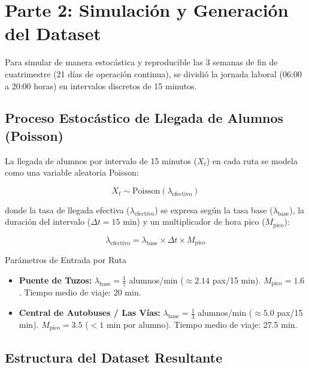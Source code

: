 \section{Parte 2: Simulación y Generación del Dataset}

Para simular de manera estocástica y reproducible las 3 semanas de fin de cuatrimestre (21 días de operación continua), se dividió la jornada laboral (06:00 a 20:00 horas) en intervalos discretos de 15 minutos.

\subsection{Proceso Estocástico de Llegada de Alumnos (Poisson)}

La llegada de alumnos por intervalo de 15 minutos ($X_t$) en cada ruta se modela como una variable aleatoria Poisson:

\begin{equation}
	X_t \sim \text{Poisson}(\lambda_{\text{efectivo}})
\end{equation}

donde la tasa de llegada efectiva ($\lambda_{\text{efectivo}}$) se expresa según la tasa base ($\lambda_{\text{base}}$), la duración del intervalo ($\Delta t = 15$ min) y un multiplicador de hora pico ($M_{\text{pico}}$):

\begin{equation}
	\lambda_{\text{efectivo}} = \lambda_{\text{base}} \times \Delta t \times M_{\text{pico}}
\end{equation}

\begin{statbox}{Parámetros de Entrada por Ruta}
	\begin{itemize}
		\item \textbf{Puente de Tuzos:} $\lambda_{\text{base}} = \frac{1}{7}$ alumnos/min ($\approx 2.14$ pax/15 min). $M_{\text{pico}} = 1.6$. Tiempo medio de viaje: 20 min.
		\item \textbf{Central de Autobuses / Las Vías:} $\lambda_{\text{base}} = \frac{1}{3}$ alumnos/min ($\approx 5.0$ pax/15 min). $M_{\text{pico}} = 3.5$ ($< 1$ min por alumno). Tiempo medio de viaje: 27.5 min.
	\end{itemize}
\end{statbox}

\subsection{Estructura del Dataset Resultante}

